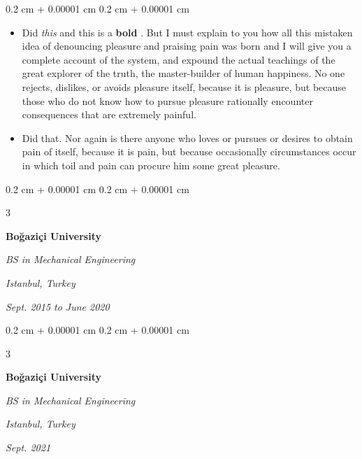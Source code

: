 \documentclass[10pt, letterpaper]{article}
\newenvironment{highlights}{
    \begin{itemize}[
        topsep=0.10 cm,
        parsep=0.10 cm,
        partopsep=0pt,
        itemsep=0pt,
        leftmargin=0.4 cm + 10pt + 0.6 cm
    ]
}{
    \end{itemize}
} %
\newenvironment{onecolentry}{
    \begin{adjustwidth}{
        0.2 cm + 0.00001 cm
    }{
        0.2 cm + 0.00001 cm
    }
}{
    \end{adjustwidth}
} %
\newenvironment{threecolentry}[3][]{
    \onecolentry
    \def\thirdColumn{#3}
    \setcolumnwidth{0.6 cm, \fill, 4.5 cm}
    \begin{paracol}{3}
    #2 \switchcolumn
}{
    \switchcolumn \raggedleft \thirdColumn
    \end{paracol}
    \endonecolentry
} %
\let\hrefWithoutArrow\href
\renewcommand{\href}[2]{\hrefWithoutArrow{#1}{\mbox{\ifthenelse{\equal{#2}{}}{ }{#2 }\raisebox{.15ex}{\footnotesize \faExternalLink*}}}}
\begin{document}
        \vspace{0.10 cm-3px}
        \begin{onecolentry}
            \begin{highlights}
                \item Did \textit{this} and this is a \textbf{bold} \href{https://example.com}{link}. But I must explain to you how all this mistaken idea of denouncing pleasure and praising pain was born and I will give you a complete account of the system, and expound the actual teachings of the great explorer of the truth, the master-builder of human happiness. No one rejects, dislikes, or avoids pleasure itself, because it is pleasure, but because those who do not know how to pursue pleasure rationally encounter consequences that are extremely painful.
                \item Did that. Nor again is there anyone who loves or pursues or desires to obtain pain of itself, because it is pain, but because occasionally circumstances occur in which toil and pain can procure him some great pleasure.
            \end{highlights}
        \end{onecolentry}


        \vspace{0.2 cm-3px}

        \begin{threecolentry}{
            \vspace*{\fill}
            \textbullet
            \vspace*{3px}
            \vspace*{\fill}
        }{
        \textit{Istanbul, Turkey}    
            
        \textit{Sept. 2015 to June 2020}}
            \textbf{Boğaziçi University}

            \textit{BS in Mechanical Engineering}
        \end{threecolentry}



        \vspace{0.2 cm-3px}

        \begin{threecolentry}{
            \vspace*{\fill}
            \textbullet
            \vspace*{3px}
            \vspace*{\fill}
        }{
        \textit{Istanbul, Turkey}    
            
        \textit{Sept. 2021}}
            \textbf{Boğaziçi University}

            \textit{BS in Mechanical Engineering}
        \end{threecolentry}
\end{document}
